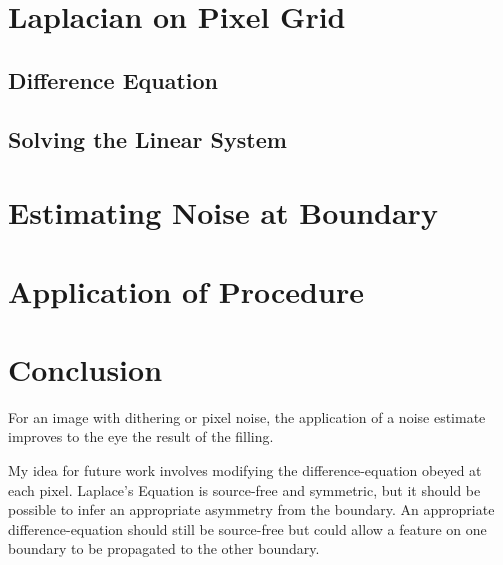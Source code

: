\documentclass{article}
\begin{document}
\section{Laplacian on Pixel Grid}

\subsection{Difference Equation}

\subsection{Solving the Linear System}

\section{Estimating Noise at Boundary}

\section{Application of Procedure}

\section{Conclusion}

For an image with dithering or pixel noise, the application of a noise estimate
improves to the eye the result of the filling.

My idea for future work involves modifying the difference-equation obeyed at
each pixel.  Laplace's Equation is source-free and symmetric, but it should be
possible to infer an appropriate asymmetry from the boundary.  An appropriate
difference-equation should still be source-free but could allow a feature on
one boundary to be propagated to the other boundary.
\end{document}
